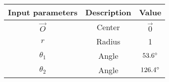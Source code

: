   \begin{tabular}{|c|c|c|}
    \hline
         \textbf{Input parameters}& \textbf{Description}&\textbf{Value} \\
         \hline
        $\vec{O}$ & Center&$\vec{0}$ \\
        \hline
        $r$&Radius &1\\
        \hline
       $\theta_1$&Angle &$53.6\degree$ \\
       \hline
	  $\theta_2$&Angle &$126.4\degree$ \\    
	  \hline

    \end{tabular}
